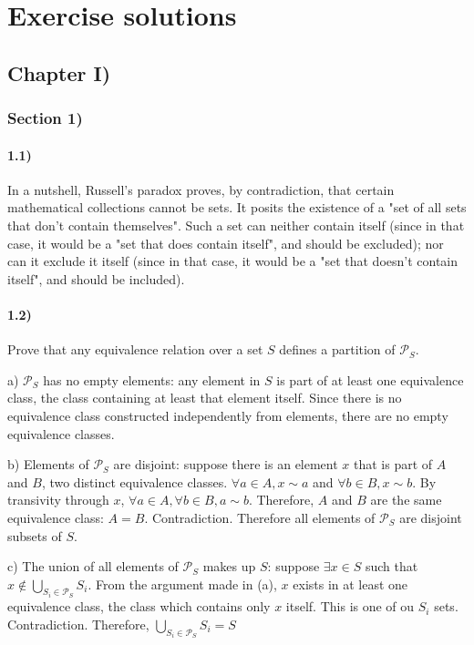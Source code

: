 \documentclass[12pt, letterpaper, twoside]{report}
\begin{document}
\part{Exercise solutions}
\chapter*{Chapter I)}

\section*{Section 1)}

\subsection*{1.1)}

In a nutshell, Russell's paradox proves, by contradiction, that certain mathematical collections cannot be sets. It posits the existence of a "set of all sets that don't contain themselves". Such a set can neither contain itself (since in that case, it would be a "set that does contain itself", and should be excluded); nor can it exclude it itself (since in that case, it would be a "set that doesn't contain itself", and should be included).



\subsection*{1.2)}

Prove that any equivalence relation over a set $S$ defines a partition of $\mathcal{P}_S$.

a) $\mathcal{P}_S$ has no empty elements: any element in $S$ is part of at least one equivalence class, the class containing at least that element itself. Since there is no equivalence class constructed independently from elements, there are no empty equivalence classes.

b) Elements of $\mathcal{P}_S$ are disjoint: suppose there is an element $x$ that is part of $A$ and $B$, two distinct equivalence classes. $\forall a \in A, x \sim a$ and $\forall b \in B, x \sim b$. By transivity through $x$, $\forall a \in A, \forall b \in B, a \sim b$. Therefore, $A$ and $B$ are the same equivalence class: $A = B$. Contradiction. Therefore all elements of $\mathcal{P}_S$ are disjoint subsets of $S$.

c) The union of all elements of $\mathcal{P}_S$ makes up $S$: suppose $\exists x \in S$ such that $x \notin \bigcup_{S_i \in \mathcal{P}_S} S_i$. From the argument made in (a), $x$ exists in at least one equivalence class, the class which contains only $x$ itself. This is one of ou $S_i$ sets. Contradiction. Therefore, $\bigcup_{S_i \in \mathcal{P}_S} S_i = S$
\end{document}
